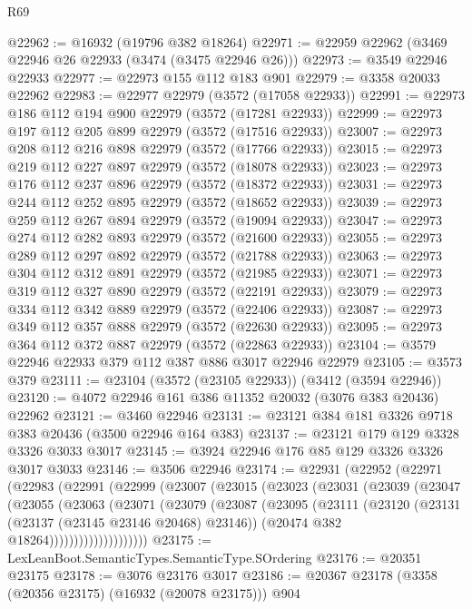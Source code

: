 \begin{lexlean}{R69}
\begin{coremodule}
@22962 := @16932 (@19796 @382 @18264)
@22971 := @22959 @22962 (@3469 @22946 @26 @22933 (@3474 (@3475 @22946 @26)))
@22973 := @3549 @22946 @22933
@22977 := @22973 @155 @112 @183 @901
@22979 := @3358 @20033 @22962
@22983 := @22977 @22979 (@3572 (@17058 @22933))
@22991 := @22973 @186 @112 @194 @900 @22979 (@3572 (@17281 @22933))
@22999 := @22973 @197 @112 @205 @899 @22979 (@3572 (@17516 @22933))
@23007 := @22973 @208 @112 @216 @898 @22979 (@3572 (@17766 @22933))
@23015 := @22973 @219 @112 @227 @897 @22979 (@3572 (@18078 @22933))
@23023 := @22973 @176 @112 @237 @896 @22979 (@3572 (@18372 @22933))
@23031 := @22973 @244 @112 @252 @895 @22979 (@3572 (@18652 @22933))
@23039 := @22973 @259 @112 @267 @894 @22979 (@3572 (@19094 @22933))
@23047 := @22973 @274 @112 @282 @893 @22979 (@3572 (@21600 @22933))
@23055 := @22973 @289 @112 @297 @892 @22979 (@3572 (@21788 @22933))
@23063 := @22973 @304 @112 @312 @891 @22979 (@3572 (@21985 @22933))
@23071 := @22973 @319 @112 @327 @890 @22979 (@3572 (@22191 @22933))
@23079 := @22973 @334 @112 @342 @889 @22979 (@3572 (@22406 @22933))
@23087 := @22973 @349 @112 @357 @888 @22979 (@3572 (@22630 @22933))
@23095 := @22973 @364 @112 @372 @887 @22979 (@3572 (@22863 @22933))
@23104 := @3579 @22946 @22933 @379 @112 @387 @886 @3017 @22946 @22979
@23105 := @3573 @379
@23111 := @23104 (@3572 (@23105 @22933)) (@3412 (@3594 @22946))
@23120 := @4072 @22946 @161 @386 @11352 @20032 (@3076 @383 @20436) @22962
@23121 := @3460 @22946
@23131 := @23121 @384 @181 @3326 @9718 @383 @20436 (@3500 @22946 @164 @383)
@23137 := @23121 @179 @129 @3328 @3326 @3033 @3017
@23145 := @3924 @22946 @176 @85 @129 @3326 @3326 @3017 @3033
@23146 := @3506 @22946
@23174 := @22931
    (@22952
      (@22971
        (@22983
          (@22991
            (@22999
              (@23007
                (@23015
                  (@23023
                    (@23031
                      (@23039
                        (@23047
                          (@23055
                            (@23063
                              (@23071
                                (@23079
                                  (@23087
                                    (@23095
                                      (@23111
                                        (@23120
                                          (@23131 (@23137 (@23145 @23146 @20468) @23146))
                                          (@20474 @382 @18264))))))))))))))))))))
@23175 := LexLeanBoot.SemanticTypes.SemanticType.SOrdering
@23176 := @20351 @23175
@23178 := @3076 @23176 @3017
@23186 := @20367 @23178 (@3358 (@20356 @23175) (@16932 (@20078 @23175))) @904

\end{coremodule}
\end{lexlean}
